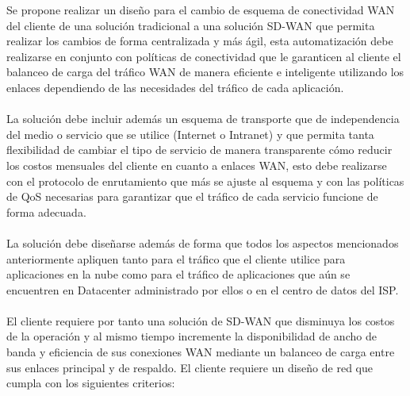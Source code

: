 Se propone realizar un diseño para el cambio de esquema de conectividad WAN del cliente de una solución tradicional a una solución SD-WAN que permita realizar los cambios de forma centralizada y más ágil, esta automatización debe realizarse en conjunto con políticas de conectividad que le garanticen al cliente el balanceo de carga del tráfico WAN de manera eficiente e inteligente utilizando los enlaces dependiendo de las necesidades del tráfico de cada aplicación.
\\
\\
	La solución debe incluir además un esquema de transporte que de independencia del medio o servicio que se utilice (Internet o Intranet) y que permita tanta flexibilidad de cambiar el tipo de servicio de manera transparente cómo reducir los costos mensuales del cliente en cuanto a enlaces WAN, esto debe realizarse con el protocolo de enrutamiento que más se ajuste al esquema y con las políticas de QoS necesarias para garantizar que el tráfico de cada servicio funcione de forma adecuada.
\\
\\
	La solución debe diseñarse además de forma que todos los aspectos mencionados anteriormente apliquen tanto para el tráfico que el cliente utilice para aplicaciones en la nube como para el tráfico de aplicaciones que aún se encuentren en Datacenter administrado por ellos o en el centro de datos del ISP.
\\
\\
	El cliente requiere por tanto una solución de SD-WAN que disminuya los costos de la operación y al mismo tiempo incremente la disponibilidad de ancho de banda y eficiencia de sus conexiones WAN mediante un balanceo de carga entre sus enlaces principal y de respaldo. El cliente requiere un diseño de red que cumpla con los siguientes criterios:

